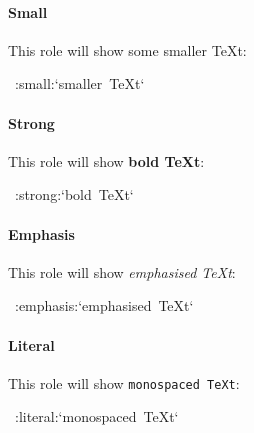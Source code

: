 \documentclass[12pt]{article}
\begin{document}
\hypertarget{lsmall}{}
\paragraph{Small}

This role will show some {\small smaller \TeX{}t}:

\begin{ttfamily}\begin{flushleft}
\mbox{~:small:`smaller~\TeX{}t`}\\
\end{flushleft}\end{ttfamily}

\hypertarget{lstrong}{}
\paragraph{Strong}

This role will show \textbf{bold \TeX{}t}:

\begin{ttfamily}\begin{flushleft}
\mbox{~:strong:`bold~\TeX{}t`}\\
\end{flushleft}\end{ttfamily}

\hypertarget{lemphasis}{}
\paragraph{Emphasis}

This role will show \emph{emphasised \TeX{}t}:

\begin{ttfamily}\begin{flushleft}
\mbox{~:emphasis:`emphasised~\TeX{}t`}\\
\end{flushleft}\end{ttfamily}

\hypertarget{lliteral}{}
\paragraph{Literal}

This role will show \texttt{monospaced \TeX{}t}:

\begin{ttfamily}\begin{flushleft}
\mbox{~:literal:`monospaced~\TeX{}t`}\\
\end{flushleft}\end{ttfamily}
\end{document}
